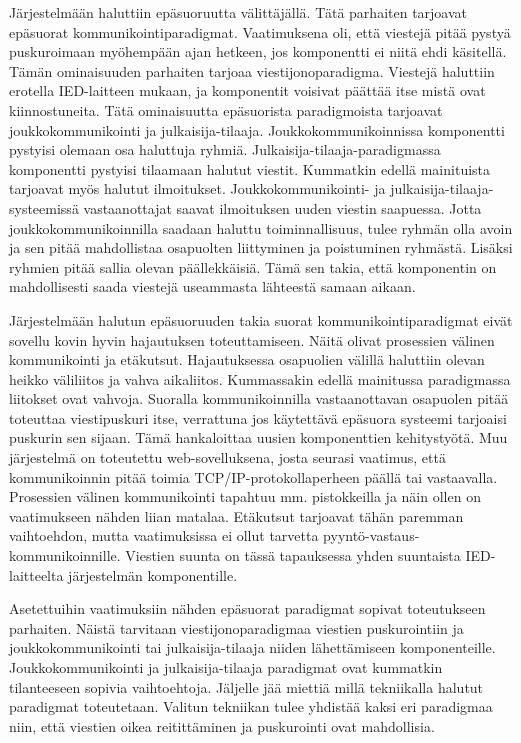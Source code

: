 Järjestelmään haluttiin epäsuoruutta välittäjällä. Tätä parhaiten tarjoavat epäsuorat kommunikointiparadigmat. Vaatimuksena oli, että viestejä pitää pystyä puskuroimaan myöhempään ajan hetkeen, jos komponentti ei niitä ehdi käsitellä. Tämän ominaisuuden parhaiten tarjoaa viestijonoparadigma. Viestejä haluttiin erotella IED-laitteen mukaan, ja komponentit voisivat päättää itse mistä ovat kiinnostuneita. Tätä ominaisuutta epäsuorista paradigmoista tarjoavat joukkokommunikointi ja julkaisija-tilaaja. Joukkokommunikoinnissa komponentti pystyisi olemaan osa haluttuja ryhmiä. Julkaisija-tilaaja-paradigmassa komponentti pystyisi tilaamaan halutut viestit. Kummatkin edellä mainituista tarjoavat myös halutut ilmoitukset. Joukkokommunikointi- ja julkaisija-tilaaja-systeemissä vastaanottajat saavat ilmoituksen uuden viestin saapuessa. Jotta joukkokommunikoinnilla saadaan haluttu toiminnallisuus, tulee ryhmän olla avoin ja sen pitää mahdollistaa osapuolten liittyminen ja poistuminen ryhmästä. Lisäksi ryhmien pitää sallia olevan päällekkäisiä. Tämä sen takia, että komponentin on mahdollisesti saada viestejä useammasta lähteestä samaan aikaan.

Järjestelmään halutun epäsuoruuden takia suorat kommunikointiparadigmat eivät sovellu kovin hyvin hajautuksen toteuttamiseen. Näitä olivat prosessien välinen kommunikointi ja etäkutsut. Hajautuksessa osapuolien välillä haluttiin olevan heikko väliliitos ja vahva aikaliitos. Kummassakin edellä mainitussa paradigmassa liitokset ovat vahvoja. Suoralla kommunikoinnilla vastaanottavan osapuolen pitää toteuttaa viestipuskuri itse, verrattuna jos käytettävä epäsuora systeemi tarjoaisi puskurin sen sijaan. Tämä hankaloittaa uusien komponenttien kehitystyötä. Muu järjestelmä on toteutettu web-sovelluksena, josta seurasi vaatimus, että kommunikoinnin pitää toimia TCP/IP-protokollaperheen päällä tai vastaavalla. Prosessien välinen kommunikointi tapahtuu mm. pistokkeilla ja näin ollen on vaatimukseen nähden liian matalaa. Etäkutsut tarjoavat tähän paremman vaihtoehdon, mutta vaatimuksissa ei ollut tarvetta pyyntö-vastaus-kommunikoinnille. Viestien suunta on tässä tapauksessa yhden suuntaista IED-laitteelta järjestelmän komponentille.

Asetettuihin vaatimuksiin nähden epäsuorat paradigmat sopivat toteutukseen parhaiten. Näistä tarvitaan viestijonoparadigmaa viestien puskurointiin ja joukkokommunikointi tai julkaisija-tilaaja niiden lähettämiseen komponenteille. Joukkokommunikointi ja julkaisija-tilaaja paradigmat ovat kummatkin tilanteeseen sopivia vaihtoehtoja. Jäljelle jää miettiä millä tekniikalla halutut paradigmat toteutetaan. Valitun tekniikan tulee yhdistää kaksi eri paradigmaa niin, että viestien oikea reitittäminen ja puskurointi ovat mahdollisia.

